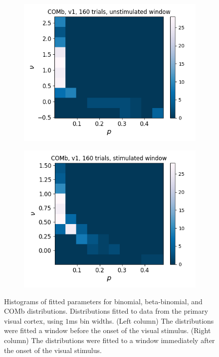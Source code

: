 \begin{figure}[p]
\begin{subfigure}[h]{0.5\linewidth}
        \label{fig:v1_1ms_beta_binom_stim}
      \end{subfigure}
      \begin{subfigure}[h]{0.5\linewidth}
        \includegraphics[width=\linewidth]{figures/conway_maxwell/v1_1ms_comb_unstim.png}
        \label{fig:v1_1ms_comb_unstim}
      \end{subfigure}
      \begin{subfigure}[h]{0.5\linewidth}
        \includegraphics[width=\linewidth]{figures/conway_maxwell/v1_1ms_comb_stim.png}
        \label{fig:v1_1ms_comb_stim}
      \end{subfigure}
      \caption{Histograms of fitted parameters for binomial, beta-binomial, and COMb distributions. Distributions fitted to data from the primary visual cortex, using $1$ms bin widths. (Left column) The distributions were fitted a window before the onset of the visual stimulus. (Right column) The distributions were fitted to a window immediately after the onset of the visual stimulus.}
      \label{fig:fitted_parameter_hists}
    \end{figure}

